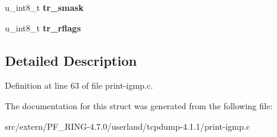 \begin{DoxyCompactItemize}
\item 
\hypertarget{structtr__resp_acdbcdcd6448f106bbdeff011204fa277}{
u\_\-int8\_\-t {\bfseries tr\_\-smask}}
\label{structtr__resp_acdbcdcd6448f106bbdeff011204fa277}

\item 
\hypertarget{structtr__resp_a0699bb6350845e92dbdf5fff4bcaf95c}{
u\_\-int8\_\-t {\bfseries tr\_\-rflags}}
\label{structtr__resp_a0699bb6350845e92dbdf5fff4bcaf95c}

\end{DoxyCompactItemize}


\subsection{Detailed Description}


Definition at line 63 of file print-\/igmp.c.



The documentation for this struct was generated from the following file:\begin{DoxyCompactItemize}
\item 
src/extern/PF\_\-RING-\/4.7.0/userland/tcpdump-\/4.1.1/print-\/igmp.c\end{DoxyCompactItemize}
